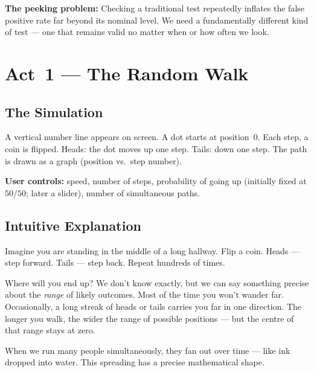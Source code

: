 \documentclass[12pt, a4paper]{article}
\begin{document}
\begin{keytakeaway}
\textbf{The peeking problem:} Checking a traditional test repeatedly inflates
the false positive rate far beyond its nominal level.  We need a fundamentally
different kind of test --- one that remains valid no matter when or how often
we look.
\end{keytakeaway}


\newpage
\section{Act~1 --- The Random Walk}

\subsection{The Simulation}

\begin{simulation}
A vertical number line appears on screen.  A dot starts at position~0.  Each
step, a coin is flipped.  Heads: the dot moves up one step.  Tails: down one
step.  The path is drawn as a graph (position vs.\ step number).

\textbf{User controls:} speed, number of steps, probability of going up
(initially fixed at $50/50$; later a slider), number of simultaneous paths.
\end{simulation}

\subsection{Intuitive Explanation}

\begin{intuition}
Imagine you are standing in the middle of a long hallway.  Flip a coin.
Heads --- step forward.  Tails --- step back.  Repeat hundreds of times.

Where will you end up?  We don't know exactly, but we can say something
precise about the \emph{range} of likely outcomes.  Most of the time you won't
wander far.  Occasionally, a long streak of heads or tails carries you far in
one direction.  The longer you walk, the wider the range of possible positions
--- but the centre of that range stays at zero.

When we run many people simultaneously, they fan out over time --- like ink
dropped into water.  This spreading has a precise mathematical shape.
\end{intuition}
\end{document}
